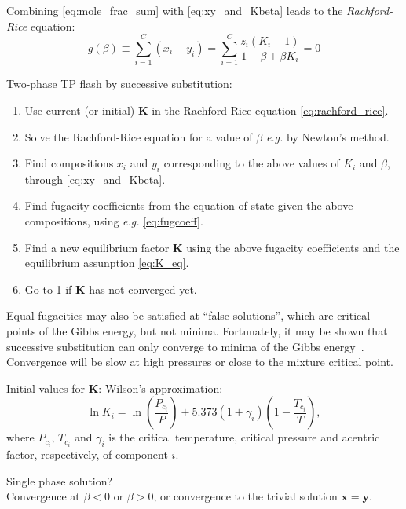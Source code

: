 \documentclass[english]{../thermomemo/thermomemo}
\newcommand*{\vektor}[1]{\boldsymbol{#1}}%
\begin{document}
Combining \eqref{eq:mole_frac_sum} with \eqref{eq:xy_and_Kbeta} leads to the \textit{Rachford-Rice} equation:
\begin{equation}
  g(\beta) \equiv \sum_{i=1}^C \left( x_i - y_i \right) = \sum_{i=1}^C \frac{z_i \left( K_i -1 \right)}{1 -\beta + \beta K_i} = 0
  \label{eq:rachford_rice}
\end{equation}
\begin{framed}
Two-phase TP flash by successive substitution:  
\begin{enumerate}
  \item Use current (or initial) $\vektor{K}$ in the Rachford-Rice equation \eqref{eq:rachford_rice}.
  \item Solve the Rachford-Rice equation for a value of $\beta$ \textit{e.g.} by Newton's method.
  \item Find compositions $x_i$ and $y_i$ corresponding to the above values of $K_i$ and $\beta$, through \eqref{eq:xy_and_Kbeta}.
  \item Find fugacity coefficients from the equation of state given the above compositions, using \textit{e.g.} \eqref{eq:fugcoeff}.
  \item Find a new equilibrium factor $\vektor{K}$ using the above fugacity coefficients and the equilibrium assunption \eqref{eq:K_eq}.
  \item Go to 1 if $\vektor{K}$ has not converged yet.
\end{enumerate}
\end{framed}
Equal fugacities may also be satisfied at ``false solutions'', which are critical points of the Gibbs energy, but not minima.
Fortunately, it may be shown that successive substitution can only converge to minima of the Gibbs energy~\cite{michelsen07}.
Convergence will be slow at high pressures or close to the mixture critical point.

Initial values for $\vektor{K}$:
Wilson's approximation:
\begin{equation}
  \ln K_i = \ln \left( \frac{P_{c_i}}{P} \right) + 5.373(1+\gamma_i) \left( 1-\frac{T_{c_i}}{T} \right),
  \label{eq:wilson_K}
\end{equation}
where $P_{c_i}$, $T_{c_i}$ and $\gamma_{i}$ is the critical temperature, critical pressure and acentric factor, respectively, 
of component $i$.

Single phase solution?\\
Convergence at $\beta <0$ or $\beta>0$, or convergence to the trivial solution $\vektor{x} = \vektor{y}$.\\
\end{document}
